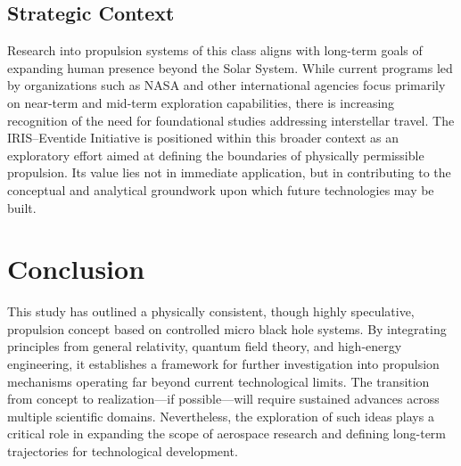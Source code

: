 \documentclass[conference]{IEEEtran}
\begin{document}
\subsection{Strategic Context}
Research into propulsion systems of this class aligns with long-term goals of expanding human presence beyond the Solar System. While current programs led by organizations such as NASA and other international agencies focus primarily on near-term and mid-term exploration capabilities, there is increasing recognition of the need for foundational studies addressing interstellar travel.
The IRIS–Eventide Initiative is positioned within this broader context as an exploratory effort aimed at defining the boundaries of physically permissible propulsion. Its value lies not in immediate application, but in contributing to the conceptual and analytical groundwork upon which future technologies may be built.
\section{Conclusion}
This study has outlined a physically consistent, though highly speculative, propulsion concept based on controlled micro black hole systems. By integrating principles from general relativity, quantum field theory, and high-energy engineering, it establishes a framework for further investigation into propulsion mechanisms operating far beyond current technological limits.
The transition from concept to realization—if possible—will require sustained advances across multiple scientific domains. Nevertheless, the exploration of such ideas plays a critical role in expanding the scope of aerospace research and defining long-term trajectories for technological development.
\end{document}
